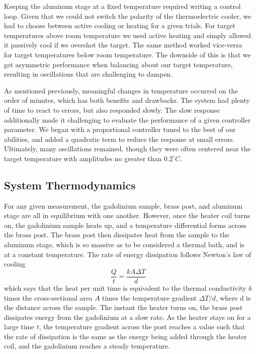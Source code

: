 \documentclass[%
reprint,
amsmath,amssymb,
aps,
]{revtex4-2}
\begin{document}
	Keeping the aluminum stage at a fixed temperature required writing a control loop. Given that we could not switch the polarity of the thermoelectric cooler, we had to choose between active cooling or heating for a given trials. For target temperatures above room temperature we used active heating and simply allowed it passively cool if we overshot the target. The same method worked vice-versa for target temperatures below room temperature. The downside of this is that we get asymmetric performance when balancing about our target temperature, resulting in oscillations that are challenging to dampen.
	
	As mentioned previously, meaningful changes in temperature occurred on the order of minutes, which has both benefits and drawbacks. The system had plenty of time to react to errors, but also responded slowly. The slow response additionally made it challenging to evaluate the performance of a given controller parameter. We began with a proportional controller tuned to the best of our abilities, and added a quadratic term to reduce the response at small errors. Ultimately, many oscillations remained, though they were often centered near the target temperature with amplitudes no greater than $0.2^{\circ} C$.
	
	\subsection{\label{sec:level2}System Thermodynamics}
	For any given measurement, the gadolinium sample, brass post, and aluminum stage are all in equilibrium with one another. However, once the heater coil turns on, the gadolinium sample heats up, and a temperature differential forms across the brass post. The brass post then dissipates heat from the sample to the aluminum stage, which is so massive as to be considered a thermal bath, and is at a constant temperature. The rate of energy dissipation follows Newton's law of cooling
	\begin{equation}
	\frac{Q}{t} = \frac{kA\Delta T}{d}
	\end{equation}	
	which says that the heat per unit time is equivalent to the thermal conductivity $k$ times the cross-sectional area $A$ times the temperature gradient $\Delta T/d$, where d is the distance across the sample. The instant the heater turns on, the brass post dissipates energy from the gadolinium at a slow rate. As the heater stays on for a large time $t$, the temperature gradient across the post reaches a value such that the rate of dissipation is the same as the energy being added through the heater coil, and the gadolinium reaches a steady temperature.
	
\end{document}
